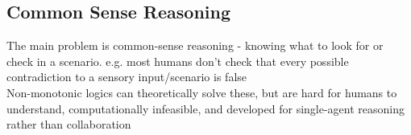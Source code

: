 \subsection{Common Sense Reasoning}
The main problem is common-sense reasoning - knowing what to look for or check in a scenario. e.g. most humans don't check that every possible contradiction to a sensory input/scenario is false\\
Non-monotonic logics can theoretically solve these, but are hard for humans to understand, computationally infeasible, and developed for single-agent reasoning rather than collaboration